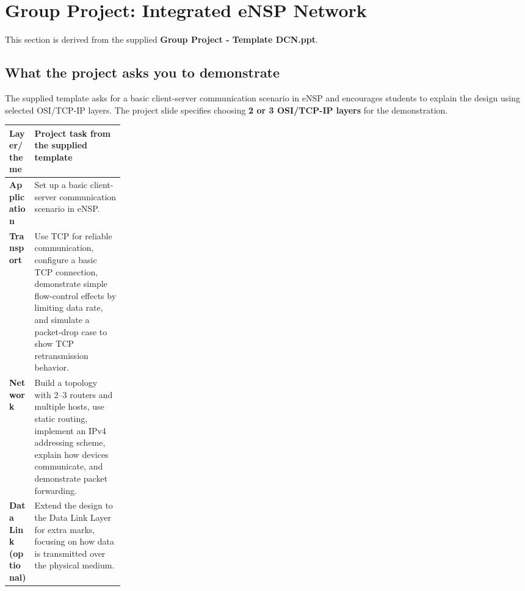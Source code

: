 \chapter*{Group Project: Integrated eNSP Network}
\begin{sourcebasis}This section is derived from the supplied \textbf{Group Project - Template DCN.ppt}.\end{sourcebasis}

\section*{What the project asks you to demonstrate}
The supplied template asks for a basic client-server communication scenario in eNSP and encourages students to explain the design using selected OSI/TCP-IP layers. The project slide specifies choosing \textbf{2 or 3 OSI/TCP-IP layers} for the demonstration.

\begin{tabularx}{\linewidth}{>{\bfseries}p{0.22\linewidth}X}
\toprule
Layer/theme & Project task from the supplied template\\\midrule
Application & Set up a basic client-server communication scenario in eNSP.\\
Transport & Use TCP for reliable communication, configure a basic TCP connection, demonstrate simple flow-control effects by limiting data rate, and simulate a packet-drop case to show TCP retransmission behavior.\\
Network & Build a topology with 2--3 routers and multiple hosts, use static routing, implement an IPv4 addressing scheme, explain how devices communicate, and demonstrate packet forwarding.\\
Data Link (optional) & Extend the design to the Data Link Layer for extra marks, focusing on how data is transmitted over the physical medium.\\\bottomrule
\end{tabularx}

